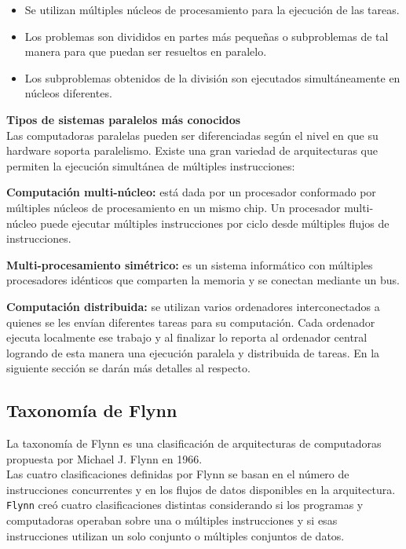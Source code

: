 \begin{itemize}
 \item Se utilizan múltiples núcleos de procesamiento para la ejecución de las tareas.
 \item Los problemas son divididos en partes más pequeñas o subproblemas de tal manera para que puedan ser resueltos en paralelo.
 \item Los subproblemas obtenidos de la división son ejecutados simultáneamente en núcleos diferentes.\\
\end{itemize}


\textbf{\newline \large Tipos de sistemas paralelos más conocidos} \vspace{5 mm} \\
Las computadoras paralelas pueden ser diferenciadas según el nivel en que su hardware soporta paralelismo. Existe una gran variedad de arquitecturas que permiten la ejecución simultánea de múltiples instrucciones:

\textbf{\newline Computación multi-núcleo:} está dada por un procesador conformado por múltiples núcleos de procesamiento en un mismo chip. Un procesador multi-núcleo puede ejecutar múltiples instrucciones por ciclo desde múltiples flujos de instrucciones.

\textbf{\newline Multi-procesamiento simétrico:} es un sistema informático con múltiples procesadores idénticos que comparten la memoria y se conectan mediante un bus.

\textbf{\newline Computación distribuida:} se utilizan varios ordenadores interconectados a quienes se les envían diferentes tareas para su computación. Cada ordenador ejecuta localmente ese trabajo y al finalizar lo reporta al ordenador central logrando de esta manera una ejecución paralela y distribuida de tareas. En la siguiente sección se darán más detalles al respecto.

\subsection{Taxonomía de Flynn}

La taxonomía de Flynn es una clasificación de arquitecturas de computadoras propuesta por Michael J. Flynn en 1966.\\
Las cuatro clasificaciones definidas por Flynn se basan en el número de instrucciones concurrentes y en los flujos de datos disponibles en la arquitectura.\\
\texttt{Flynn} creó cuatro clasificaciones distintas considerando si los programas y computadoras operaban sobre una o múltiples instrucciones y si esas instrucciones utilizan un solo conjunto o múltiples conjuntos de datos.\\

